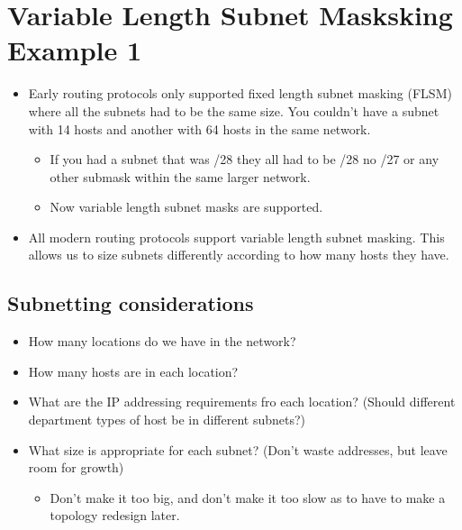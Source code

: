 \section{Variable Length Subnet Masksking Example 1}
\begin{itemize}
    \item Early routing protocols only supported fixed length subnet masking (FLSM) where all the subnets had to be the same size. You couldn't have a subnet with 14 hosts and another with 64 hosts in the same network.
        \begin{itemize}
            \item If you had a subnet that was /28 they all had to be /28 no /27 or any other submask within the same larger network.
            \item Now variable length subnet masks are supported.
        \end{itemize}
        
    \item All modern routing protocols support variable length subnet masking. This allows us to size subnets differently according to how many hosts they have. 
\end{itemize}

\subsection{Subnetting considerations}
\begin{itemize}
    \item How many locations do we have in the network?
    \item How many hosts are in each location?
    \item What are the IP addressing requirements fro each location? (Should different department types of host be in different subnets?)
    \item What size is appropriate for each subnet? (Don't waste addresses, but leave room for growth)
        \begin{itemize}
            \item Don't make it too big, and don't make it too slow as to have to make a topology redesign later.
        \end{itemize}
\end{itemize}

